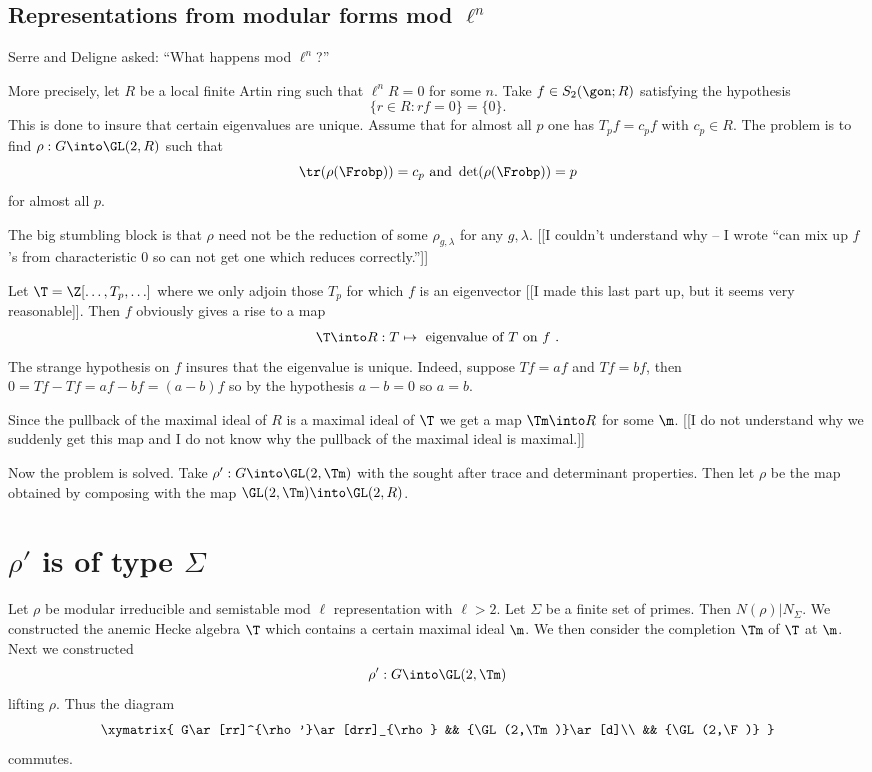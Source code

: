 \documentclass{report}
\begin{document}
\subsection{Representations from modular forms mod $\ell^n$}
Serre and Deligne asked: ``What happens mod $\ell^n$?''

More precisely, let $R$ be a local finite Artin ring such that
$\ell^n R=0$ for some $n$.
Take $f\in S_2(\gon;R)$ satisfying the hypothesis
$$\{r\in R : rf=0 \} = \{0\}.$$
This is done to insure that certain eigenvalues are unique.
Assume that for almost all $p$ one has
$T_p f = c_p f$ with $c_p\in R$.
The problem is to find $\rho:G\into\GL(2,R)$ such that
$$\tr(\rho(\Frobp))=c_p\text{ and }\det(\rho(\Frobp))=p$$
for almost all $p$.

The big stumbling block is that $\rho$ need not be the reduction
of some $\rho_{g,\lambda}$ for any $g, \lambda$. [[I couldn't understand
why -- I wrote ``can mix up $f$'s from characteristic 0 so can not
get one which reduces correctly.'']]

Let $\T=\Z[\ldots,T_p,\ldots]$ where we only adjoin those $T_p$
for which $f$ is an eigenvector [[I made this last part up, but
it seems very reasonable]]. Then $f$ obviously gives a rise to
a map
$$\T\into R : T\mapsto \text{ eigenvalue of $T$ on $f$ }.$$
The strange hypothesis on $f$ insures that the eigenvalue is unique.
Indeed, suppose $Tf=a f$ and $Tf=bf$, then $0=Tf-Tf=af-bf=(a-b)f$
so by the hypothesis $a-b=0$ so $a=b$.

Since the pullback of the maximal ideal of $R$ is a maximal ideal
of $\T$ we get a map $\Tm\into R$ for some $\m$. [[I do not
understand why we suddenly get this map and I do not know why the
pullback of the maximal ideal is maximal.]]

Now the problem is solved. Take $\rho':G\into\GL(2,\Tm)$
with the sought after trace and determinant properties.
Then let $\rho$ be the map obtained by composing with the
map $\GL(2,\Tm)\into\GL(2,R)$.

\section{$\rho'$ is of type $\Sigma$}
Let $\rho$ be modular irreducible and
semistable mod $\ell$ representation
with $\ell>2$. Let $\Sigma$ be a finite set of primes.
Then $N(\rho)|N_{\Sigma}$.
We constructed the anemic Hecke algebra $\T$ which contains a
certain maximal ideal $\m$. We then consider the completion
$\Tm$ of $\T$ at $\m$. Next we constructed
$$\rho':G\into\GL(2,\Tm)$$ lifting $\rho$. Thus the diagram
$$\xymatrix{
  G\ar[rr]^{\rho'}\ar[drr]_{\rho} && {\GL(2,\Tm)}\ar[d]\\
                 && {\GL(2,\F)}
}$$
commutes.
\end{document}
